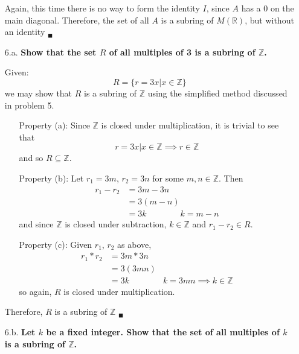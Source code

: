 \documentclass{article}
\begin{document}
\begin{enumerate}
			Again, this time there is no way to form the identity $I$, since $A$ has a $0$ on the 
			main diagonal. Therefore, the set of all $A$ is a subring of $M(\mathbb{R})$, but 
			without an identity $_{\blacksquare}$

		\item [6.a.] \textbf{Show that the set $R$ of all multiples of 3 is a subring of 
						$\mathbb{Z}$.}

			Given:
			\begin{equation*}
				R = \lbrace r = 3x | x \in \mathbb{Z} \rbrace
			\end{equation*}
			we may show that $R$ is a subring of $\mathbb{Z}$ using the simplified method discussed
			in problem 5.

			\begin{enumerate}
				\item [Property (a):] Since $\mathbb{Z}$ is closed under multiplication, it is 
					trivial to see that 
					\begin{equation*}
						r = 3x | x \in \mathbb{Z} \implies r \in \mathbb{Z}
					\end{equation*} 
					and so $R \subseteq \mathbb{Z}$.
				\item [Property (b):] Let $r_1 = 3m$, $r_2 = 3n$ for some $m, n \in \mathbb{Z}$. 
					Then 
					\begin{align*}
						r_1 - r_2 & = 3m - 3n \\
								  & = 3(m - n) \\
								  & = 3k \qquad \qquad k = m - n
					\end{align*}
					and since $\mathbb{Z}$ is closed under subtraction, $k \in \mathbb{Z}$ and 
					$r_1 - r_2 \in R$.
				\item [Property (c):] Given $r_1$, $r_2$ as above,
					\begin{align*}
						r_1 * r_2 & = 3m * 3n \\
								  & = 3(3mn) \\
								  & = 3k \qquad \qquad k = 3mn \implies k \in \mathbb{Z}
					\end{align*}
					so again, $R$ is closed under multiplication.
			\end{enumerate}

			Therefore, $R$ is a subring of $\mathbb{Z}$ $_{\blacksquare}$

		\item [6.b.] \textbf{Let $k$ be a fixed integer. Show that the set of all multiples of $k$ 
						is a subring of $\mathbb{Z}$.}		


\end{enumerate}
\end{document}
